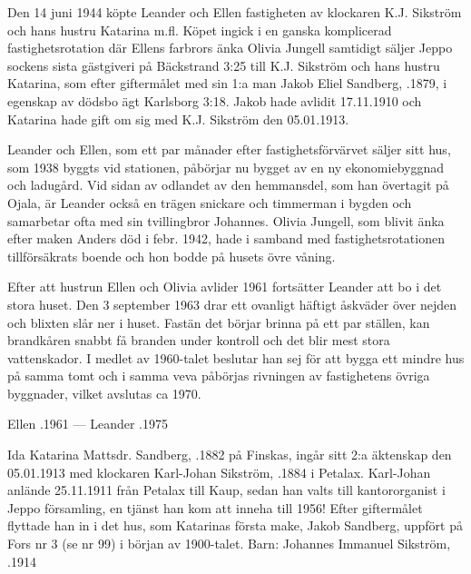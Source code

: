 {{{{Den 14 juni 1944 köpte Leander och Ellen fastigheten av klockaren K.J. Sikström och hans hustru Katarina  m.fl. Köpet ingick i en ganska komplicerad fastighetsrotation där Ellens farbrors änka Olivia Jungell samtidigt säljer Jeppo sockens sista gästgiveri på Bäckstrand 3:25 till K.J. Sikström och hans hustru Katarina, som efter giftermålet med sin 1:a man Jakob Eliel Sandberg, .1879, i egenskap av dödsbo ägt Karlsborg 3:18. Jakob hade avlidit 17.11.1910 och Katarina hade gift om sig med K.J. Sikström den 05.01.1913.

Leander och Ellen, som ett par månader efter fastighetsförvärvet säljer sitt hus, som 1938 byggts vid stationen, påbörjar nu bygget av en ny ekonomiebyggnad och ladugård. Vid sidan av odlandet av den hemmansdel, som han övertagit på Ojala, är Leander också en trägen snickare och timmerman i bygden och samarbetar ofta med sin tvillingbror Johannes. Olivia Jungell, som blivit änka efter maken Anders död i febr. 1942, hade i samband med fastighetsrotationen tillförsäkrats boende och hon bodde på husets övre våning.

Efter att hustrun Ellen och Olivia avlider 1961 fortsätter Leander att bo i det stora huset. Den 3 september 1963 drar ett ovanligt häftigt åskväder över nejden och blixten slår ner i huset. Fastän det börjar brinna på ett par ställen, kan brandkåren snabbt få branden under kontroll och det blir mest stora vattenskador. I medlet av 1960-talet beslutar han sej för att bygga ett mindre hus på samma tomt och i samma veva påbörjas rivningen av fastighetens övriga byggnader, vilket avslutas ca 1970.
\begin{jhchildren}
  \item {}
  \item {}
\end{jhchildren}

Ellen .1961  ---  Leander .1975


Ida Katarina Mattsdr. Sandberg, .1882 på Finskas, ingår sitt 2:a äktenskap den 05.01.1913 med klockaren Karl-Johan Sikström, .1884 i Petalax. Karl-Johan anlände 25.11.1911 från Petalax till Kaup, sedan han valts till kantororganist i Jeppo församling, en tjänst han kom att inneha till 1956! Efter giftermålet flyttade han in i det hus, som Katarinas första make, Jakob Sandberg, uppfört på Fors nr 3 (se nr 99) i början av 1900-talet.
Barn: Johannes Immanuel Sikström, .1914

}}}}
